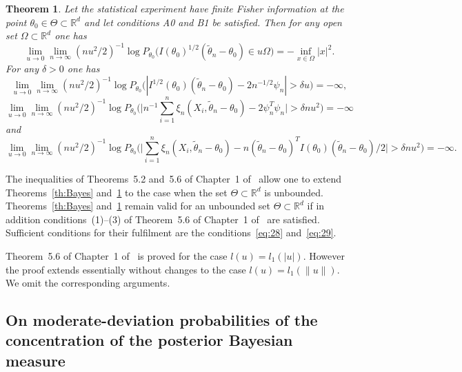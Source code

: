 \documentclass[11pt,a4paper]{article}
\newtheorem{theorem}{Theorem}[section]
\begin{document}
\begin{theorem}\label{th:Bayes-Bahadur}
Let the statistical experiment have finite Fisher information at the point $\theta_0\in\Theta\subset\mathbb{R}^d$ and let conditions A0 and B1 be satisfied. Then for any open set $\Omega\subset\mathbb{R}^d$ one has
\begin{equation}
\lim_{u\to 0}\lim_{n\to\infty}(nu^2/2)^{-1}\log P_{\theta_0}\bigl(I(\theta_0)^{1/2}(\tilde\theta_n-\theta_0)\in u\Omega\bigr)=-\inf_{x\in\Omega}|x|^2.
\label{eq:37}
\end{equation}
For any $\delta>0$ one has
\begin{equation}
\lim_{u\to 0}\lim_{n\to\infty}(nu^2/2)^{-1}\log P_{\theta_0}\bigl(|I^{1/2}(\theta_0)(\tilde\theta_n-\theta_0)-2n^{-1/2}\psi_n|>\delta u\bigr)=-\infty,
\label{eq:38}
\end{equation}
\begin{equation}
\lim_{u\to 0}\lim_{n\to\infty}(nu^2/2)^{-1}\log P_{\theta_0}\Biggl(
\Biggl|n^{-1}\sum_{i=1}^n\xi_n(X_i,\tilde\theta_n-\theta_0)-2\psi_n^T\psi_n\Biggr|>\delta nu^2\Biggr)=-\infty
\label{eq:39}
\end{equation}
and
\begin{equation}
\lim_{u\to 0}\lim_{n\to\infty}(nu^2/2)^{-1}\log P_{\theta_0}\Biggl(
\Biggl|\sum_{i=1}^n\xi_n(X_i,\tilde\theta_n-\theta_0)
-n(\tilde\theta_n-\theta_0)^T I(\theta_0)(\tilde\theta_n-\theta_0)/2\Biggr|>\delta nu^2\Biggr)=-\infty.
\label{eq:40}
\end{equation}
\end{theorem}

The inequalities of Theorems~5.2 and~5.6 of Chapter~1 of~\cite{10} allow one to extend Theorems~\ref{th:Bayes} and~\ref{th:Bayes-Bahadur} to the case when the set $\Theta\subset\mathbb{R}^d$ is unbounded. Theorems~\ref{th:Bayes} and~\ref{th:Bayes-Bahadur} remain valid for an unbounded set $\Theta\subset\mathbb{R}^d$ if in addition conditions~(1)--(3) of Theorem~5.6 of Chapter~1 of~\cite{10} are satisfied. Sufficient conditions for their fulfilment are the conditions~\eqref{eq:28} and~\eqref{eq:29}.

Theorem~5.6 of Chapter~1 of~\cite{10} is proved for the case $l(u)=l_1(|u|)$. However the proof extends essentially without changes to the case $l(u)=l_1(\|u\|)$. We omit the corresponding arguments.

\subsection{On moderate-deviation probabilities of the concentration of the posterior Bayesian measure}
\end{document}
